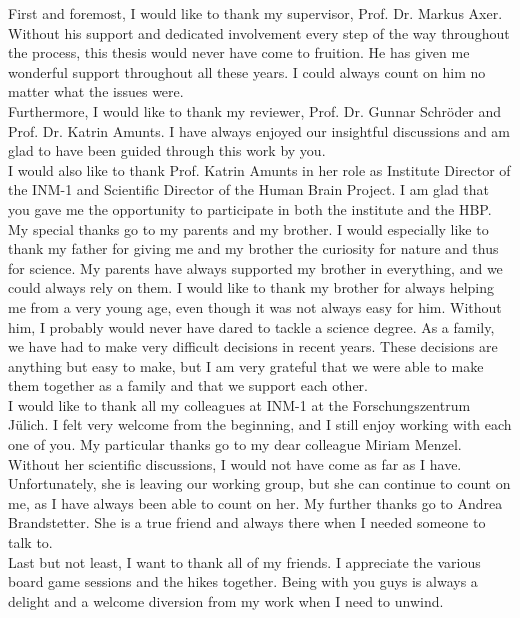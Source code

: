 \label{sec:acknowledgement}
%
First and foremost, I would like to thank my supervisor, Prof. Dr. Markus Axer.
Without his support and dedicated involvement every step of the way throughout the process, this thesis would never have come to fruition.
He has given me wonderful support throughout all these years.
I could always count on him no matter what the issues were.
\\
%
Furthermore, I would like to thank my reviewer, Prof. Dr. Gunnar Schr{\"o}der and Prof. Dr. Katrin Amunts.
I have always enjoyed our insightful discussions and am glad to have been guided through this work by you.
\\
%
I would also like to thank Prof. Katrin Amunts in her role as Institute Director of the INM-1 and Scientific Director of the Human Brain Project.
I am glad that you gave me the opportunity to participate in both the institute and the HBP.
\\
%
My special thanks go to my parents and my brother.
I would especially like to thank my father for giving me and my brother the curiosity for nature and thus for science.
My parents have always supported my brother in everything, and we could always rely on them.
I would like to thank my brother for always helping me from a very young age, even though it was not always easy for him.
Without him, I probably would never have dared to tackle a science degree.
As a family, we have had to make very difficult decisions in recent years.
These decisions are anything but easy to make, but I am very grateful that we were able to make them together as a family and that we support each other.
\\
%
I would like to thank all my colleagues at INM-1 at the Forschungszentrum J{\"u}lich.
I felt very welcome from the beginning, and I still enjoy working with each one of you.
My particular thanks go to my dear colleague Miriam Menzel.
Without her scientific discussions, I would not have come as far as I have.
Unfortunately, she is leaving our working group, but she can continue to count on me, as I have always been able to count on her.
My further thanks go to Andrea Brandstetter.
She is a true friend and always there when I needed someone to talk to.
\\
%
Last but not least, I want to thank all of my friends.
I appreciate the various board game sessions and the hikes together.
Being with you guys is always a delight and a welcome diversion from my work when I need to unwind. 